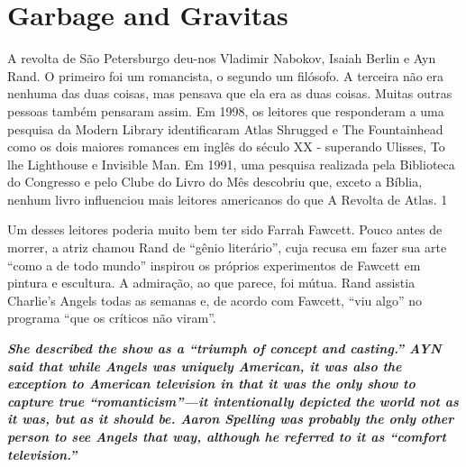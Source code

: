  
 \chapter{Garbage and Gravitas}  

 \label{Garbage and Gravitas}  
 
 
\par
 
 
 \textit{	}  

 
\par
 
 
 
\par
 

 \textbf{\textit{	} }  

 
\par
 
A revolta de São Petersburgo deu-nos Vladimir Nabokov, Isaiah Berlin e Ayn Rand. O primeiro foi um romancista, o segundo um filósofo. A terceira não era nenhuma das duas coisas, mas pensava que ela era as duas coisas. Muitas outras pessoas também pensaram assim. Em 1998, os leitores que responderam a uma pesquisa da Modern Library identificaram Atlas Shrugged e The Fountainhead como os dois maiores romances em inglês do século XX - superando Ulisses, To lhe Lighthouse e Invisible Man. Em 1991, uma pesquisa realizada pela Biblioteca do Congresso e pelo Clube do Livro do Mês descobriu que, exceto a Bíblia, nenhum livro influenciou mais leitores americanos do que A Revolta de Atlas.
 {\color{blue} 1}  

 
\par
 
Um desses leitores poderia muito bem ter sido Farrah Fawcett. Pouco antes de morrer, a atriz chamou Rand de “gênio literário”, cuja recusa em fazer sua arte “como a de todo mundo” inspirou os próprios experimentos de Fawcett em pintura e escultura. A admiração, ao que parece, foi mútua. Rand assistia Charlie's Angels todas as semanas e, de acordo com Fawcett, “viu algo” no programa “que os críticos não viram”.
 
\par
 

 \textbf{\textit{She described the show as a “triumph of concept and casting.” AYN said that while Angels was uniquely American, it was also the exception to American television in that it was the only show to capture true “romanticism”—it intentionally depicted the world not as it was, but as it should be. Aaron Spelling was probably the only other person to see Angels that way, although he referred to it as “comfort television.”} }  
 
